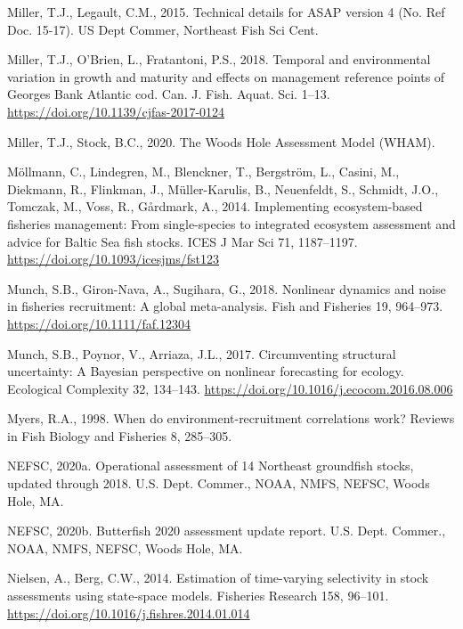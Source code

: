 \documentclass[]{article}
\begin{document}
\leavevmode\hypertarget{ref-miller2015Technical}{}%
Miller, T.J., Legault, C.M., 2015. Technical details for ASAP version 4
(No. Ref Doc. 15-17). US Dept Commer, Northeast Fish Sci Cent.

\leavevmode\hypertarget{ref-miller2018Temporal}{}%
Miller, T.J., O'Brien, L., Fratantoni, P.S., 2018. Temporal and
environmental variation in growth and maturity and effects on management
reference points of Georges Bank Atlantic cod. Can. J. Fish. Aquat. Sci.
1--13. \url{https://doi.org/10.1139/cjfas-2017-0124}

\leavevmode\hypertarget{ref-miller2020Woods}{}%
Miller, T.J., Stock, B.C., 2020. The Woods Hole Assessment Model (WHAM).

\leavevmode\hypertarget{ref-mollmann2014Implementing}{}%
Möllmann, C., Lindegren, M., Blenckner, T., Bergström, L., Casini, M.,
Diekmann, R., Flinkman, J., Müller-Karulis, B., Neuenfeldt, S., Schmidt,
J.O., Tomczak, M., Voss, R., Gårdmark, A., 2014. Implementing
ecosystem-based fisheries management: From single-species to integrated
ecosystem assessment and advice for Baltic Sea fish stocks. ICES J Mar
Sci 71, 1187--1197. \url{https://doi.org/10.1093/icesjms/fst123}

\leavevmode\hypertarget{ref-munch2018Nonlinear}{}%
Munch, S.B., Giron-Nava, A., Sugihara, G., 2018. Nonlinear dynamics and
noise in fisheries recruitment: A global meta-analysis. Fish and
Fisheries 19, 964--973. \url{https://doi.org/10.1111/faf.12304}

\leavevmode\hypertarget{ref-munch2017Circumventing}{}%
Munch, S.B., Poynor, V., Arriaza, J.L., 2017. Circumventing structural
uncertainty: A Bayesian perspective on nonlinear forecasting for
ecology. Ecological Complexity 32, 134--143.
\url{https://doi.org/10.1016/j.ecocom.2016.08.006}

\leavevmode\hypertarget{ref-myers1998When}{}%
Myers, R.A., 1998. When do environment-recruitment correlations work?
Reviews in Fish Biology and Fisheries 8, 285--305.

\leavevmode\hypertarget{ref-nefsc2020Operational}{}%
NEFSC, 2020a. Operational assessment of 14 Northeast groundfish stocks,
updated through 2018. U.S. Dept. Commer., NOAA, NMFS, NEFSC, Woods Hole,
MA.

\leavevmode\hypertarget{ref-nefsc2020Butterfish}{}%
NEFSC, 2020b. Butterfish 2020 assessment update report. U.S. Dept.
Commer., NOAA, NMFS, NEFSC, Woods Hole, MA.

\leavevmode\hypertarget{ref-nielsen2014Estimation}{}%
Nielsen, A., Berg, C.W., 2014. Estimation of time-varying selectivity in
stock assessments using state-space models. Fisheries Research 158,
96--101. \url{https://doi.org/10.1016/j.fishres.2014.01.014}
\end{document}
